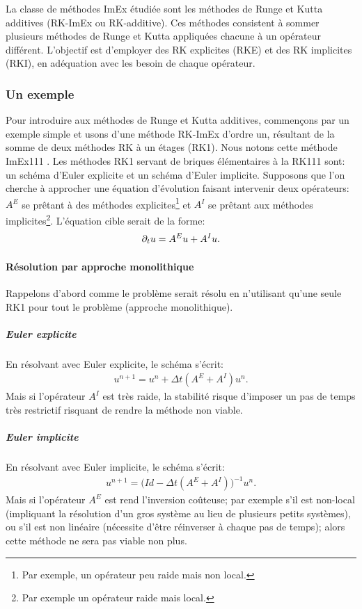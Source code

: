 \label{par:ImEx_presentation}
La classe de méthodes ImEx étudiée sont les méthodes de Runge et Kutta additives (RK-ImEx ou RK-additive).
Ces méthodes consistent à sommer plusieurs méthodes de Runge et Kutta appliquées chacune à un opérateur différent.
L'objectif est d'employer des RK explicites (RKE) et des RK implicites (RKI), en adéquation avec les besoin de chaque opérateur.
\subsubsection{Un exemple}
    Pour introduire aux méthodes de Runge et Kutta additives, commençons par un exemple simple et usons d'une méthode RK-ImEx
    d'ordre un, résultant de la somme de deux méthodes RK à un étages (RK1). Nous notons cette méthode ImEx111 \cite{ASCHER1997151}. 
    Les méthodes RK1 servant de briques élémentaires à la RK111 sont: un schéma d'Euler explicite et un schéma d'Euler implicite.
    Supposons que l'on cherche à approcher une équation d'évolution faisant intervenir deux opérateurs: $A^E$ se prêtant à des méthodes explicites\footnote{Par exemple, un opérateur peu raide mais non local.}
    et $A^I$ se prêtant aux méthodes implicites\footnote{Par exemple un opérateur raide mais local.}. L'équation cible serait de la forme: 
    \begin{align}
        \partial_t u = A^E u + A^I u.
    \end{align}
    \paragraph{Résolution par approche monolithique}
        Rappelons d'abord comme le problème serait résolu en n'utilisant qu'une seule RK1 pour tout le problème (approche monolithique).
        \subparagraph{Euler explicite}
            En résolvant avec Euler explicite, le schéma s'écrit: 
            \begin{align}
                u^{n+1} = u^n + \Delta t (A^E + A^I) u^n.
            \end{align}
            Mais si l'opérateur $A^I$ est très raide, la stabilité risque d'imposer un pas de temps très restrictif risquant de rendre la méthode non viable.
        \subparagraph{Euler implicite}
            En résolvant avec Euler implicite, le schéma s'écrit:
            \begin{align}
                u^{n+1} = \bigl(Id - \Delta t (A^E + A^I)\bigr)^{-1} u^n.
            \end{align}
            Mais si l'opérateur $A^E$ est rend l'inversion coûteuse;
            par exemple s'il est non-local (impliquant la résolution d'un gros système au lieu de plusieurs petits systèmes), 
            ou s'il est non linéaire (nécessite d'être réinverser à chaque pas de temps);
            alors cette méthode ne sera pas viable non plus.
